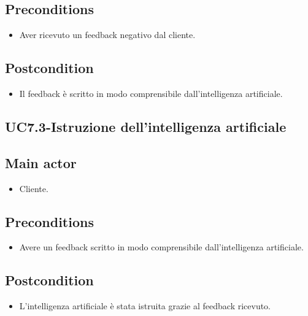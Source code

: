 \documentclass{article}
\begin{document}
     \subsection*{Preconditions} 
        \begin{itemize}
            \item Aver ricevuto un feedback negativo dal cliente.
        \end{itemize}
        \subsection*{Postcondition} 
        \begin{itemize}
            \item Il feedback è scritto in modo comprensibile dall'intelligenza artificiale.
        \end{itemize}
\subsection{UC7.3-Istruzione dell'intelligenza artificiale}
    
     \subsection*{Main actor}
         \begin{itemize}
             \item Cliente.
         \end{itemize}
     \subsection*{Preconditions} 
        \begin{itemize}
            \item Avere un feedback scritto in modo comprensibile dall'intelligenza artificiale.
        \end{itemize}
        \subsection*{Postcondition} 
        \begin{itemize}
            \item L'intelligenza artificiale è stata istruita grazie al feedback ricevuto.
        \end{itemize}
\end{document}
